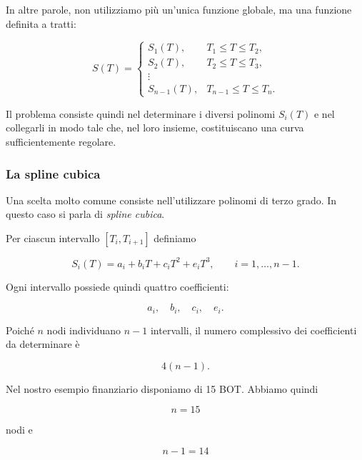 In altre parole, non utilizziamo più un'unica funzione globale, ma una
funzione definita a tratti:

\begin{equation*}
S(T)=
\begin{cases}
S_1(T), & T_1\leq T\leq T_2,\\
S_2(T), & T_2\leq T\leq T_3,\\
\vdots & \\
S_{n-1}(T), & T_{n-1}\leq T\leq T_n.
\end{cases}
\end{equation*}

Il problema consiste quindi nel determinare i diversi polinomi
$S_i(T)$ e nel collegarli in modo tale che, nel loro insieme,
costituiscano una curva sufficientemente regolare.


\subsubsection{La spline cubica}

Una scelta molto comune consiste nell'utilizzare polinomi di terzo
grado. In questo caso si parla di \emph{spline cubica}.

Per ciascun intervallo $[T_i,T_{i+1}]$ definiamo

\begin{equation*}
    S_i(T)
    =
    a_i+b_iT+c_iT^2+e_iT^3,
    \qquad i=1,\ldots,n-1.
    \label{eq:cubic-spline}
\end{equation*}

Ogni intervallo possiede quindi quattro coefficienti:

\begin{equation*}
    a_i,\quad b_i,\quad c_i,\quad e_i.
\end{equation*}

Poiché $n$ nodi individuano $n-1$ intervalli, il numero complessivo
dei coefficienti da determinare è

\begin{equation*}
    4(n-1).
    \label{eq:spline-number-coefficients}
\end{equation*}

Nel nostro esempio finanziario disponiamo di 15 BOT. Abbiamo quindi

\begin{equation*}
    n=15
\end{equation*}

nodi e

\begin{equation*}
    n-1=14
\end{equation*}

